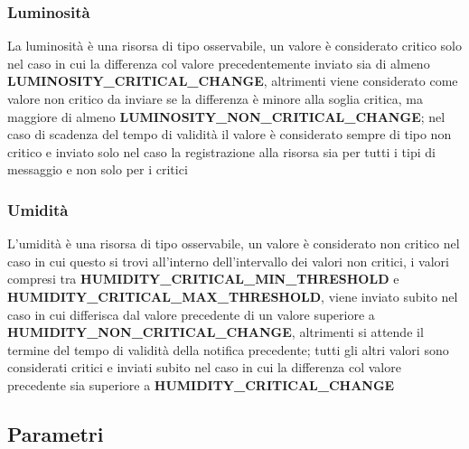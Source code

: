         

      \subsubsection{Luminosità}
        La luminosità è una risorsa di tipo osservabile, un valore è considerato critico solo nel caso in cui la differenza col valore precedentemente inviato sia di almeno \textbf{LUMINOSITY\_CRITICAL\_CHANGE}, altrimenti viene considerato come valore non critico da inviare se la differenza è minore alla soglia critica, ma maggiore
        di almeno \textbf{LUMINOSITY\_NON\_CRITICAL\_CHANGE}; nel caso di scadenza del tempo di validità il valore è considerato sempre di tipo non critico e inviato
        solo nel caso la registrazione alla risorsa sia per tutti i tipi di messaggio e non solo per i critici

        

      \subsubsection{Umidità}
        L'umidità è una risorsa di tipo osservabile, un valore è considerato non critico nel caso in cui questo si trovi all'interno dell'intervallo dei valori non critici,
        i valori compresi tra \textbf{HUMIDITY\_CRITICAL\_MIN\_THRESHOLD} e \textbf{HUMIDITY\_CRITICAL\_MAX\_THRESHOLD}, viene inviato subito nel caso in cui differisca dal
        valore precedente di un valore superiore a \textbf{HUMIDITY\_NON\_CRITICAL\_CHANGE}, altrimenti si attende il termine del tempo di validità della notifica precedente;
        tutti gli altri valori sono considerati critici e inviati subito nel caso in cui la differenza col valore precedente sia superiore a \textbf{HUMIDITY\_CRITICAL\_CHANGE}

        

    \subsection{Parametri}
